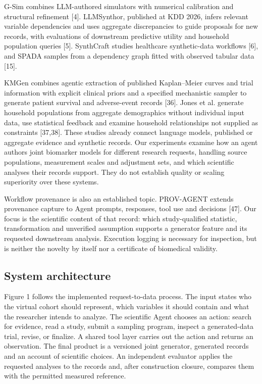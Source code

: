 \documentclass[11pt,letterpaper]{article}
\begin{document}
G-Sim combines LLM-authored simulators with numerical calibration and structural refinement [4]. LLMSynthor, published at KDD 2026, infers relevant variable dependencies and uses aggregate discrepancies to guide proposals for new records, with evaluations of downstream predictive utility and household population queries [5]. SynthCraft studies healthcare synthetic-data workflows [6], and SPADA samples from a dependency graph fitted with observed tabular data [15].


KMGen combines agentic extraction of published Kaplan–\allowbreak{}Meier curves and trial information with explicit clinical priors and a specified mechanistic sampler to generate patient survival and adverse-event records [36]. Jones et al. generate household populations from aggregate demographics without individual input data, use statistical feedback and examine household relationships not supplied as constraints [37,38]. These studies already connect language models, published or aggregate evidence and synthetic records. Our experiments examine how an agent authors joint biomarker models for different research requests, handling source populations, measurement scales and adjustment sets, and which scientific analyses their records support. They do not establish quality or scaling superiority over these systems.


Workflow provenance is also an established topic. PROV-AGENT extends provenance capture to Agent prompts, responses, tool use and decisions [47]. Our focus is the scientific content of that record: which study-qualified statistic, transformation and unverified assumption supports a generator feature and its requested downstream analysis. Execution logging is necessary for inspection, but is neither the novelty by itself nor a certificate of biomedical validity.


\subsection{System architecture}

Figure 1 follows the implemented request-to-data process. The input states who the virtual cohort should represent, which variables it should contain and what the researcher intends to analyze. The scientific Agent chooses an action: search for evidence, read a study, submit a sampling program, inspect a generated-data trial, revise, or finalize. A shared tool layer carries out the action and returns an observation. The final product is a versioned joint generator, generated records and an account of scientific choices. An independent evaluator applies the requested analyses to the records and, after construction closure, compares them with the permitted measured reference.
\end{document}

